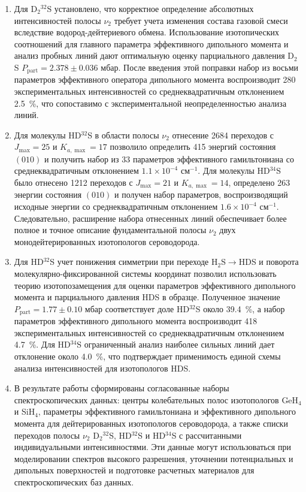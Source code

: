 \begin{enumerate}
  \item Для D$_2{}^{32}$S установлено, что корректное определение абсолютных интенсивностей полосы
  $\nu_2$ требует учета изменения состава газовой смеси вследствие водород-дейтериевого обмена.
  Использование изотопических соотношений для главного параметра эффективного дипольного момента и
  анализ пробных линий дают оптимальную оценку парциального давления D$_2$S
  $P_{\textrm{part}}=2.378\pm0.036$ мбар. После введения этой поправки набор из восьми параметров
  эффективного оператора дипольного момента воспроизводит 280 экспериментальных интенсивностей со
  среднеквадратичным отклонением 2.5~\%, что сопоставимо с экспериментальной неопределенностью анализа
  линий.

  \item Для молекулы HD$^{32}$S в области полосы $\nu_2$ отнесение 2684 переходов с $J_{\max}=25$ и
  $K_{a,\max}=17$ позволило определить 415 энергий состояния $(010)$ и получить набор из 33 параметров
  эффективного гамильтониана со среднеквадратичным отклонением $1.1\times10^{-4}$ см$^{-1}$. Для
  молекулы HD$^{34}$S было отнесено 1212 переходов с $J_{\max}=21$ и $K_{a,\max}=14$, определено 263
  энергии состояния $(010)$ и получен набор параметров, воспроизводящий исходные энергии со
  среднеквадратичным отклонением $1.6\times10^{-4}$ см$^{-1}$. Следовательно, расширение набора
  отнесенных линий обеспечивает более полное и точное описание фундаментальной полосы $\nu_2$ двух
  монодейтерированных изотопологов сероводорода.

  \item Для HD$^{32}$S учет понижения симметрии при переходе H$_2$S$\rightarrow$HDS и поворота
  молекулярно-фиксированной системы координат позволил использовать теорию изотопозамещения для оценки
  параметров эффективного дипольного момента и парциального давления HDS в образце. Полученное значение
  $P_{\textrm{part}}=1.77\pm0.10$ мбар соответствует доле HD$^{32}$S около 39.4~\%, а набор параметров
  эффективного дипольного момента воспроизводит 418 экспериментальных интенсивностей со
  среднеквадратичным отклонением 4.7~\%. Для HD$^{34}$S ограниченный анализ наиболее сильных линий дает
  отклонение около 4.0~\%, что подтверждает применимость единой схемы анализа интенсивностей для
  изотопологов HDS.

  \item В результате работы сформированы согласованные наборы спектроскопических данных: центры
  колебательных полос изотопологов GeH$_4$ и SiH$_4$, параметры эффективного гамильтониана и
  эффективного дипольного момента для дейтерированных изотопологов сероводорода, а также списки
  переходов полосы $\nu_2$ D$_2{}^{32}$S, HD$^{32}$S и HD$^{34}$S с рассчитанными индивидуальными
  интенсивностями. Эти данные могут использоваться при моделировании спектров высокого разрешения,
  уточнении потенциальных и дипольных поверхностей и подготовке расчетных материалов для
  спектроскопических баз данных.
\end{enumerate}
